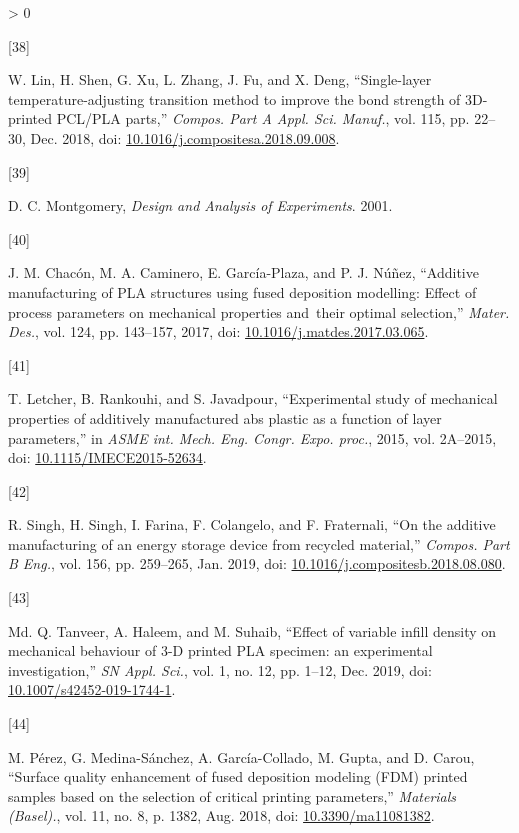 \documentclass[conference,final,]{IEEEtran}
\newlength{\csllabelwidth}
\newlength{\cslhangindent}
\newenvironment{CSLReferences}[3] %
 {%
  \setlength{\parindent}{0pt}
  \ifodd #1 \everypar{\setlength{\hangindent}{\cslhangindent}}\ignorespaces\fi
  \ifnum #2 > 0
  \setlength{\parskip}{#2\baselineskip}
  \fi
 }%
 {}
\newcommand{\CSLLeftMargin}[1]{\parbox[t]{\csllabelwidth}{#1}}
\newcommand{\CSLRightInline}[1]{\parbox[t]{\linewidth - \csllabelwidth}{#1}}
\begin{document}
\begin{CSLReferences}{0}{0}
\leavevmode\hypertarget{ref-Lin2018}{}%
\CSLLeftMargin{{[}38{]} }
\CSLRightInline{W. Lin, H. Shen, G. Xu, L. Zhang, J. Fu, and X. Deng,
{``{Single-layer temperature-adjusting transition method to improve the
bond strength of 3D-printed PCL/PLA parts},''} \emph{Compos. Part A
Appl. Sci. Manuf.}, vol. 115, pp. 22--30, Dec. 2018, doi:
\href{https://doi.org/10.1016/j.compositesa.2018.09.008}{10.1016/j.compositesa.2018.09.008}.}

\leavevmode\hypertarget{ref-Montgomery2001}{}%
\CSLLeftMargin{{[}39{]} }
\CSLRightInline{D. C. Montgomery, \emph{{Design and Analysis of
Experiments}}. 2001.}

\leavevmode\hypertarget{ref-Chacon2017}{}%
\CSLLeftMargin{{[}40{]} }
\CSLRightInline{J. M. Chacón, M. A. Caminero, E. García-Plaza, and P. J.
Núñez, {``{Additive manufacturing of PLA structures using fused
deposition modelling: Effect of process parameters on mechanical
properties and~their optimal selection},''} \emph{Mater. Des.}, vol.
124, pp. 143--157, 2017, doi:
\href{https://doi.org/10.1016/j.matdes.2017.03.065}{10.1016/j.matdes.2017.03.065}.}

\leavevmode\hypertarget{ref-Letcher2015}{}%
\CSLLeftMargin{{[}41{]} }
\CSLRightInline{T. Letcher, B. Rankouhi, and S. Javadpour,
{``{Experimental study of mechanical properties of additively
manufactured abs plastic as a function of layer parameters},''} in
\emph{ASME int. Mech. Eng. Congr. Expo. proc.}, 2015, vol. 2A--2015,
doi:
\href{https://doi.org/10.1115/IMECE2015-52634}{10.1115/IMECE2015-52634}.}

\leavevmode\hypertarget{ref-Singh2019}{}%
\CSLLeftMargin{{[}42{]} }
\CSLRightInline{R. Singh, H. Singh, I. Farina, F. Colangelo, and F.
Fraternali, {``{On the additive manufacturing of an energy storage
device from recycled material},''} \emph{Compos. Part B Eng.}, vol. 156,
pp. 259--265, Jan. 2019, doi:
\href{https://doi.org/10.1016/j.compositesb.2018.08.080}{10.1016/j.compositesb.2018.08.080}.}

\leavevmode\hypertarget{ref-Tanveer2019}{}%
\CSLLeftMargin{{[}43{]} }
\CSLRightInline{Md. Q. Tanveer, A. Haleem, and M. Suhaib, {``{Effect of
variable infill density on mechanical behaviour of 3-D printed PLA
specimen: an experimental investigation},''} \emph{SN Appl. Sci.}, vol.
1, no. 12, pp. 1--12, Dec. 2019, doi:
\href{https://doi.org/10.1007/s42452-019-1744-1}{10.1007/s42452-019-1744-1}.}

\leavevmode\hypertarget{ref-Perez2018}{}%
\CSLLeftMargin{{[}44{]} }
\CSLRightInline{M. Pérez, G. Medina-Sánchez, A. García-Collado, M.
Gupta, and D. Carou, {``{Surface quality enhancement of fused deposition
modeling (FDM) printed samples based on the selection of critical
printing parameters},''} \emph{Materials (Basel).}, vol. 11, no. 8, p.
1382, Aug. 2018, doi:
\href{https://doi.org/10.3390/ma11081382}{10.3390/ma11081382}.}


\end{CSLReferences}
\end{document}
